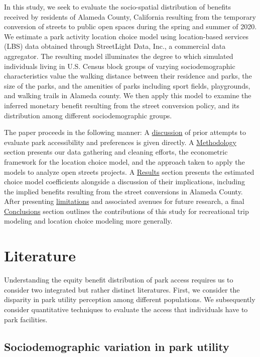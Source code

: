 \documentclass[3p, authoryear, review]{elsarticle} %
\begin{document}
In this study, we seek to evaluate the socio-spatial distribution of benefits
received by residents of Alameda County, California resulting from the
temporary conversion of streets to public open spaces during the spring and
summer of 2020. We estimate a park activity location choice model using
location-based services (LBS) data obtained through StreetLight Data, Inc., a
commercial data aggregator. The resulting model illuminates the degree to which
simulated individuals living in U.S. Census block groups of varying
sociodemographic characteristics value the walking distance between their residence
and parks, the size of the parks, and the amenities of parks including sport
fields, playgrounds, and walking trails in Alameda county. We then apply this
model to examine the inferred monetary benefit resulting from the street
conversion policy, and its distribution among different sociodemographic groups.

The paper proceeds in the following manner: A \protect\hyperlink{literature}{discussion} of prior
attempts to evaluate park accessibility and preferences is given directly. A
\protect\hyperlink{methodology}{Methodology} section presents our data gathering and cleaning
efforts, the econometric framework for the location choice model, and the
approach taken to apply the models to analyze open streets projects. A
\protect\hyperlink{results}{Results} section presents the estimated choice model coefficients
alongside a discussion of their implications, including the implied benefits
resulting from the street conversions in Alameda County. After presenting
\protect\hyperlink{limitations}{limitations} and associated avenues for future research, a final
\protect\hyperlink{conclusions}{Conclusions} section outlines the contributions of this study for
recreational trip modeling and location choice modeling more generally.

\hypertarget{literature}{%
\section{Literature}\label{literature}}

Understanding the equity benefit distribution of park access requires us to
consider two integrated but rather distinct literatures. First, we consider the
disparity in park utility perception among different populations. We
subsequently consider quantitative techniques to evaluate the access that
individuals have to park facilities.

\hypertarget{sociodemographic-variation-in-park-utility}{%
\subsection{Sociodemographic variation in park utility}\label{sociodemographic-variation-in-park-utility}}
\end{document}
